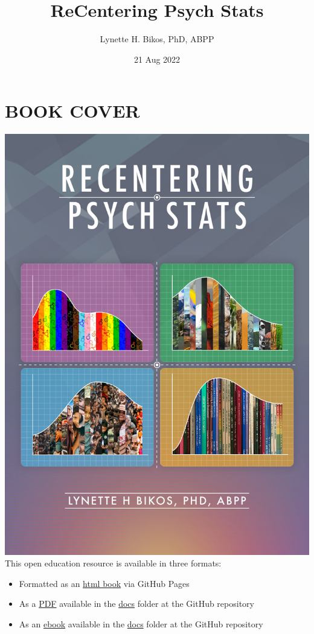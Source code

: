\documentclass[
  11pt,
]{book}
\title{ReCentering Psych Stats}
\author{Lynette H. Bikos, PhD, ABPP}
\date{21 Aug 2022}
\providecommand{\tightlist}{%
  \setlength{\itemsep}{0pt}\setlength{\parskip}{0pt}}
\begin{document}
\maketitle

{
\hypersetup{linkcolor=}
\setcounter{tocdepth}{3}
\tableofcontents
}
\hypertarget{book-cover}{%
\chapter*{BOOK COVER}\label{book-cover}}

\includegraphics{images/ReCenterPsychStats-bookcover2.jpg}
This open education resource is available in three formats:

\begin{itemize}
\tightlist
\item
  Formatted as an \href{https://lhbikos.github.io/ReCenterPsychStats/}{html book} via GitHub Pages
\item
  As a \href{https://github.com/lhbikos/ReCenterPsychStats/blob/main/docs/ReCenterPsychStats.pdf}{PDF} available in the \href{https://github.com/lhbikos/ReCenterPsychStats/tree/main/docs}{docs} folder at the GitHub repository
\item
  As an \href{https://github.com/lhbikos/ReCenterPsychStats/blob/main/docs/ReCenterPsychStats.epub}{ebook} available in the \href{https://github.com/lhbikos/ReCenterPsychStats/tree/main/docs}{docs} folder at the GitHub repository
\end{itemize}
\end{document}
